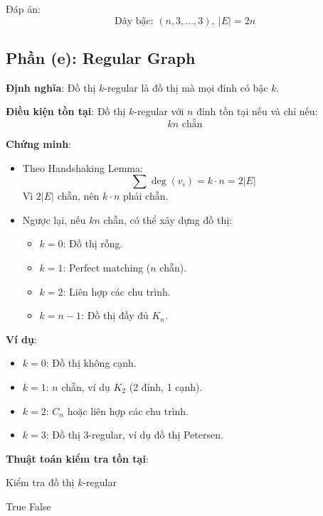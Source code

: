 \documentclass[a4paper,12pt]{article}
\theoremstyle{plain}
\theoremstyle{definition}
\begin{document}
Đáp án:
\[
\boxed{\text{Dãy bậc: } (n, 3, \ldots, 3), \ |E| = 2n}
\]

\subsection*{Phần (e): Regular Graph}

\textbf{Định nghĩa}: Đồ thị \( k \)-regular là đồ thị mà mọi đỉnh có bậc \( k \).

\textbf{Điều kiện tồn tại}: Đồ thị \( k \)-regular với \( n \) đỉnh tồn tại nếu và chỉ nếu:
\[
kn \text{ chẵn}
\]

\textbf{Chứng minh}:
\begin{itemize}
    \item Theo Handshaking Lemma:
    \[
    \sum \deg(v_i) = k \cdot n = 2|E|
    \]
    Vì \( 2|E| \) chẵn, nên \( k \cdot n \) phải chẵn.
    \item Ngược lại, nếu \( kn \) chẵn, có thể xây dựng đồ thị:
    \begin{itemize}
        \item \( k=0 \): Đồ thị rỗng.
        \item \( k=1 \): Perfect matching (\( n \) chẵn).
        \item \( k=2 \): Liên hợp các chu trình.
        \item \( k=n-1 \): Đồ thị đầy đủ \( K_n \).
    \end{itemize}
\end{itemize}

\textbf{Ví dụ}:
\begin{itemize}
    \item \( k=0 \): Đồ thị không cạnh.
    \item \( k=1 \): \( n \) chẵn, ví dụ \( K_2 \) (2 đỉnh, 1 cạnh).
    \item \( k=2 \): \( C_n \) hoặc liên hợp các chu trình.
    \item \( k=3 \): Đồ thị 3-regular, ví dụ đồ thị Petersen.
\end{itemize}

\textbf{Thuật toán kiểm tra tồn tại}:
\begin{algorithm}
\caption{Kiểm tra đồ thị \( k \)-regular}
\begin{algorithmic}
     \Return True
    \Else \Return False
    \EndIf
\EndFunction
\end{algorithmic}
\end{algorithm}
\end{document}
